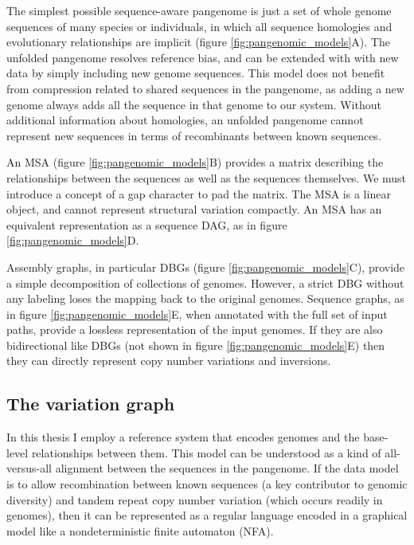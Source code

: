 The simplest possible sequence-aware pangenome is just a set of whole genome sequences of many species or individuals, in which all sequence homologies and evolutionary relationships are implicit (figure \ref{fig:pangenomic_models}A).
The unfolded pangenome resolves reference bias, and can be extended with with new data by simply including new genome sequences.
This model does not benefit from compression related to shared sequences in the pangenome, as adding a new genome always adds all the sequence in that genome to our system.
Without additional information about homologies, an unfolded pangenome cannot represent new sequences in terms of recombinants between known sequences.

An MSA (figure \ref{fig:pangenomic_models}B) provides a matrix describing the relationships between the sequences as well as the sequences themselves.
We must introduce a concept of a gap character to pad the matrix.
The MSA is a linear object, and cannot represent structural variation compactly.
An MSA has an equivalent representation as a sequence DAG, as in figure \ref{fig:pangenomic_models}D.

Assembly graphs, in particular DBGs (figure \ref{fig:pangenomic_models}C), provide a simple decomposition of collections of genomes.
However, a strict DBG without any labeling loses the mapping back to the original genomes.
Sequence graphs, as in figure \ref{fig:pangenomic_models}E, when annotated with the full set of input paths, provide a lossless representation of the input genomes.
If they are also bidirectional like DBGs (not shown in figure \ref{fig:pangenomic_models}E) then they can directly represent copy number variations and inversions.

\subsection{The variation graph}
\label{sec:the_variation_graph}

In this thesis I employ a reference system that encodes genomes and the base-level relationships between them.
This model can be understood as a kind of all-versus-all alignment between the sequences in the pangenome.
If the data model is to allow recombination between known sequences (a key contributor to genomic diversity) and tandem repeat copy number variation (which occurs readily in genomes), then it can be represented as a regular language encoded in a graphical model like a nondeterministic finite automaton (NFA).


